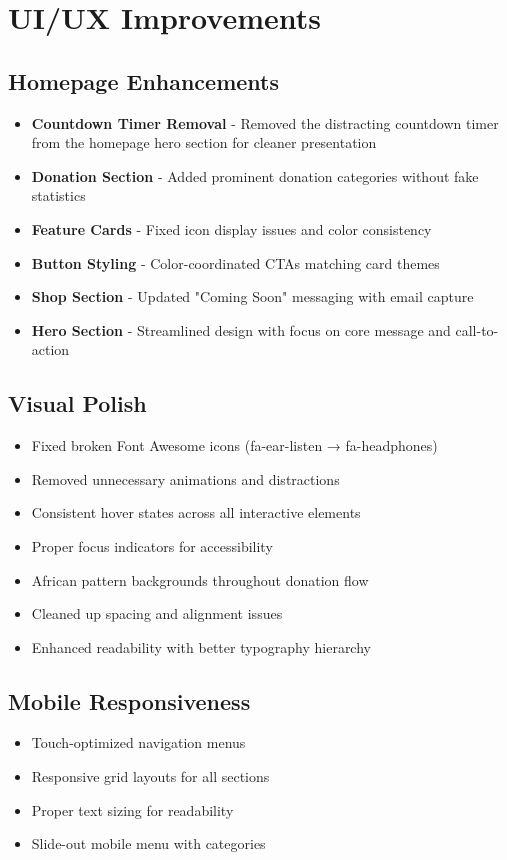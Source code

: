\documentclass[11pt,a4paper]{article}
\begin{document}
\section{UI/UX Improvements}

\subsection{Homepage Enhancements}
\begin{itemize}[leftmargin=*,itemsep=5pt]
    \item \textbf{Countdown Timer Removal} - Removed the distracting countdown timer from the homepage hero section for cleaner presentation
    \item \textbf{Donation Section} - Added prominent donation categories without fake statistics
    \item \textbf{Feature Cards} - Fixed icon display issues and color consistency
    \item \textbf{Button Styling} - Color-coordinated CTAs matching card themes
    \item \textbf{Shop Section} - Updated "Coming Soon" messaging with email capture
    \item \textbf{Hero Section} - Streamlined design with focus on core message and call-to-action
\end{itemize}

\subsection{Visual Polish}
\begin{itemize}[leftmargin=*,itemsep=5pt]
    \item Fixed broken Font Awesome icons (fa-ear-listen → fa-headphones)
    \item Removed unnecessary animations and distractions
    \item Consistent hover states across all interactive elements
    \item Proper focus indicators for accessibility
    \item African pattern backgrounds throughout donation flow
    \item Cleaned up spacing and alignment issues
    \item Enhanced readability with better typography hierarchy
\end{itemize}

\subsection{Mobile Responsiveness}
\begin{itemize}[leftmargin=*,itemsep=5pt]
    \item Touch-optimized navigation menus
    \item Responsive grid layouts for all sections
    \item Proper text sizing for readability
    \item Slide-out mobile menu with categories
\end{itemize}
\end{document}
